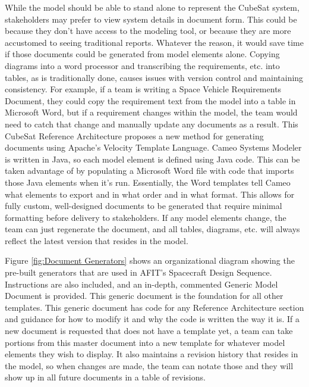 While the model should be able to stand alone to represent the CubeSat system, stakeholders may prefer to view system details in document form. This could be because they don't have access to the modeling tool, or because they are more accustomed to seeing traditional reports. Whatever the reason, it would save time if those documents could be generated from model elements alone. Copying diagrams into a word processor and transcribing the requirements, etc. into tables, as is traditionally done, causes issues with version control and maintaining consistency. For example, if a team is writing a Space Vehicle Requirements Document, they could copy the requirement text from the model into a table in Microsoft Word, but if a requirement changes within the model, the team would need to catch that change and manually update any documents as a result. This CubeSat Reference Architecture proposes a new method for generating documents using Apache's Velocity Template Language. Cameo Systems Modeler is written in Java, so each model element is defined using Java code. This can be taken advantage of by populating a Microsoft Word file with code that imports those Java elements when it's run. Essentially, the Word templates tell Cameo what elements to export and in what order and in what format. This allows for fully custom, well-designed documents to be generated that require minimal formatting before delivery to stakeholders. If any model elements change, the team can just regenerate the document, and all tables, diagrams, etc. will always reflect the latest version that resides in the model. 

Figure \ref{fig:Document Generators} shows an organizational diagram showing the pre-built generators that are used in AFIT's Spacecraft Design Sequence. Instructions are also included, and an in-depth, commented Generic Model Document is provided. This generic document is the foundation for all other templates. This generic document has code for any Reference Architecture section and guidance for how to modify it and why the code is written the way it is. If a new document is requested that does not have a template yet, a team can take portions from this master document into a new template for whatever model elements they wish to display. It also maintains a revision history that resides in the model, so when changes are made, the team can notate those and they will show up in all future documents in a table of revisions. 

